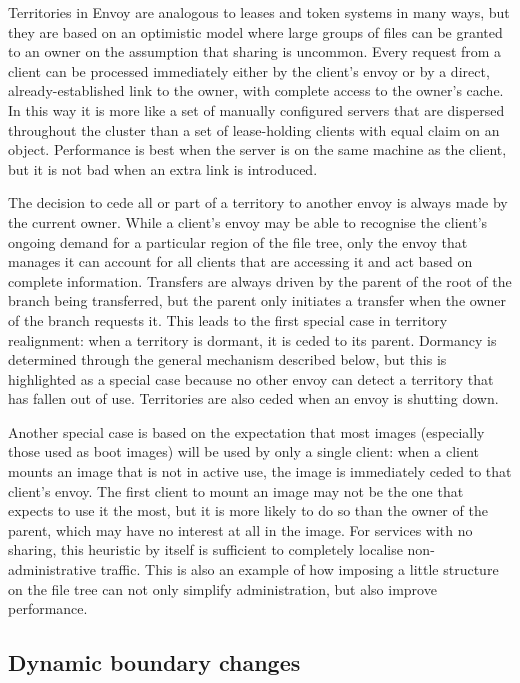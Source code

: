Territories in Envoy are analogous to leases and token systems in many ways, but they are based on an optimistic model where large groups of files can be granted to an owner on the assumption that sharing is uncommon. Every request from a client can be processed immediately either by the client's envoy or by a direct, already-established link to the owner, with complete access to the owner's cache. In this way it is more like a set of manually configured servers that are dispersed throughout the cluster than a set of lease-holding clients with equal claim on an object. Performance is best when the server is on the same machine as the client, but it is not bad when an extra link is introduced.

The decision to cede all or part of a territory to another envoy is always made by the current owner. While a client's envoy may be able to recognise the client's ongoing demand for a particular region of the file tree, only the envoy that manages it can account for all clients that are accessing it and act based on complete information. Transfers are always driven by the parent of the root of the branch being transferred, but the parent only initiates a transfer when the owner of the branch requests it. This leads to the first special case in territory realignment: when a territory is dormant, it is ceded to its parent. Dormancy is determined through the general mechanism described below, but this is highlighted as a special case because no other envoy can detect a territory that has fallen out of use. Territories are also ceded when an envoy is shutting down.

Another special case is based on the expectation that most images (especially those used as boot images) will be used by only a single client: when a client mounts an image that is not in active use, the image is immediately ceded to that client's envoy. The first client to mount an image may not be the one that expects to use it the most, but it is more likely to do so than the owner of the parent, which may have no interest at all in the image. For services with no sharing, this heuristic by itself is sufficient to completely localise non-administrative traffic. This is also an example of how imposing a little structure on the file tree can not only simplify administration, but also improve performance.

\subsection{Dynamic boundary changes}

